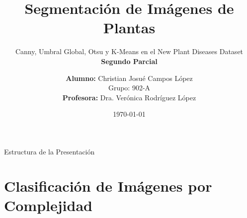 \documentclass[aspectratio=169,10pt]{beamer}
\title[PDI - Segmentación de Imágenes]{\textbf{Segmentación de Imágenes de Plantas}}
\subtitle{Canny, Umbral Global, Otsu y K-Means en el New Plant Diseases Dataset \\ \textbf{Segundo Parcial}}
\author[Christian J. Campos López]{
    \textbf{Alumno:} Christian Josué Campos López \\[0.15cm]
    \small Grupo: 902-A \\[0.15cm]
    \small \textbf{Profesora:} Dra. Verónica Rodríguez López
}
\institute[UTM]{\textbf{Universidad Tecnológica de la Mixteca} \\ Procesamiento Digital de Imágenes}
\date{\today}
\begin{document}
\begin{frame}
    \titlepage
\end{frame}

\begin{frame}{Estructura de la Presentación}
    \tableofcontents
\end{frame}

\section{Clasificación de Imágenes por Complejidad}
\end{document}
